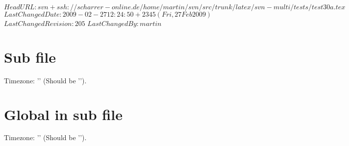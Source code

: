 \svnidlong
{$HeadURL: svn+ssh://scharrer-online.de/home/martin/svn/src/trunk/latex/svn-multi/tests/test30a.tex $}
{$LastChangedDate: 2009-02-27 12:24:50 +2345 (Fri, 27 Feb 2009) $}
{$LastChangedRevision: 205 $}
{$LastChangedBy: martin $}


\section{Sub file}
Timezone:   '' (Should be '\svnfiletimezone').\\
%

\section{Global in sub file}
Timezone:   '' (Should be '\svntimezone').\\
%

